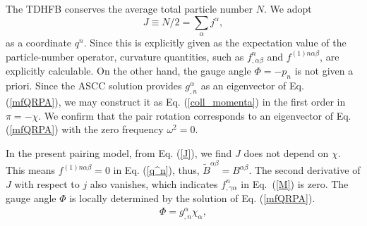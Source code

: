 \documentclass[11pt]{book} %
\begin{document}
The TDHFB conserves the average total particle number $N$.
We adopt 
\begin{equation}
	J\equiv N/2=\sum_\alpha j^\alpha, 
  \label{J}
\end{equation}
as a coordinate $q^n$.
Since this is explicitly given as the expectation value of the particle-number
operator, curvature quantities,
such as $f^n_{,\alpha\beta}$ and $f^{(1)n\alpha\beta}$,
are explicitly calculable.
On the other hand, the gauge angle $\Phi=-p_n$ is not given a priori.
Since the ASCC solution provides $g^\alpha_{,n}$ as an eigenvector of
Eq. (\ref{mfQRPA}),
we may construct it as Eq. (\ref{coll_momenta}) in the first order
in $\pi=-\chi$.
We confirm that the pair rotation corresponds to an eigenvector
of Eq. (\ref{mfQRPA}) with the zero frequency $\omega^2=0$.



In the present pairing model, 
from Eq. (\ref{J}), we find $J$ does not depend on $\chi$.
This means $f^{(1)n\alpha\beta}=0$ in Eq. (\ref{q^n}),
thus, $\tilde{B}^{\alpha\beta}=B^{\alpha\beta}$.
The second derivative of $J$ with respect to $j$ also vanishes,
which indicates $f^n_{,\gamma\alpha}$ in Eq.~(\ref{M}) is zero. 
The gauge angle $\Phi$ is locally determined
by the solution of Eq. (\ref{mfQRPA}).
\begin{align}
\Phi = g^\alpha_{,n} \chi_{\alpha},
  \label{total_gauge}
\end{align}
\end{document}
